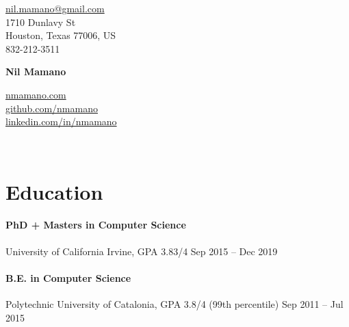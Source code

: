 \documentclass[letterpaper,10pt,oneside]{article}
\begin{document}
{\raggedleft

\begin{minipage}[c]{0.28\textwidth}
	\begin{flushleft}
	\href{mailto:nil.mamano@gmail.com}{nil.mamano@gmail.com}\\
	1710 Dunlavy St\\
	Houston, Texas 77006, US\\
	832-212-3511
	\end{flushleft}
\end{minipage}\hfill
\begin{minipage}[c]{0.3\textwidth}
	\begin{center}
		\Huge{\textbf{Nil Mamano}}
	\end{center}
\end{minipage}\hfill
\begin{minipage}[c]{0.3\textwidth}
	\begin{flushright}
	\href{http://www.nmamano.com}{nmamano.com} \\
	\href{http://www.github.com/nmamano}{github.com/nmamano} \\
	\href{http://www.linkedin.com/in/nmamano}{linkedin.com/in/nmamano}
	\end{flushright}
\end{minipage}\\
\vspace{5px}
\hrulefill
}

\vspace{-2px}
\section*{Education}
\paragraph*{PhD + Masters in Computer Science} University of California Irvine, GPA 3.83/4 \hfill Sep 2015 -- Dec 2019
\paragraph*{B.E. in Computer Science} Polytechnic University of Catalonia, GPA 3.8/4 (99th percentile) \hfill Sep 2011 -- Jul 2015
\vspace*{-1px}
\end{document}
